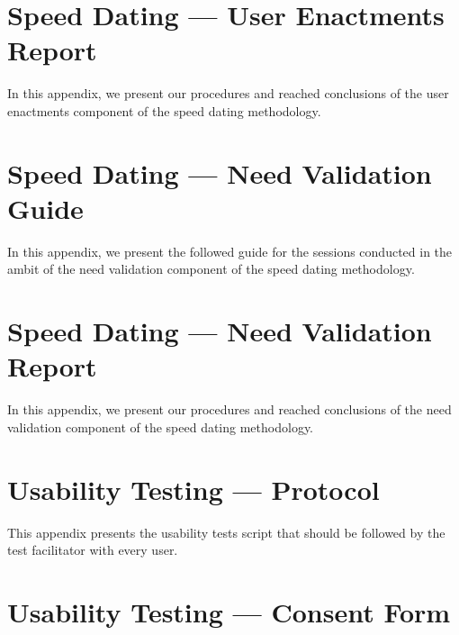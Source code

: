 \chapter{Speed Dating — User Enactments Report}
\label{chapter:appendixE}

In this appendix, we present our procedures and reached conclusions of the user enactments component of the speed dating methodology.



\chapter{Speed Dating — Need Validation Guide}
\label{chapter:appendixF}

In this appendix, we present the followed guide for the sessions conducted in the ambit of the need validation component of the speed dating methodology.




\chapter{Speed Dating — Need Validation Report}
\label{chapter:appendixG}

In this appendix, we present our procedures and reached conclusions of the need validation component of the speed dating methodology.



\chapter{Usability Testing — Protocol}
\label{chapter:appendixH}

This appendix presents the usability tests script that should be followed by the test facilitator with every user.



\chapter{Usability Testing — Consent Form}
\label{chapter:appendixI}

